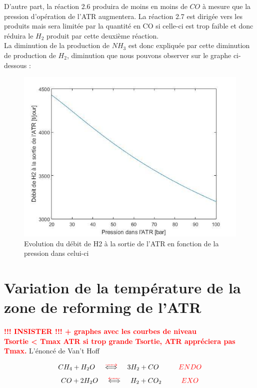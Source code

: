 \documentclass[12pt]{report}
\begin{document}
 D'autre part, la réaction 2.6 produira de moins en moins de $CO$ à mesure que la pression d'opération de l'ATR augmentera. La réaction 2.7 est dirigée vers les produits mais sera limitée par la quantité en CO si celle-ci est trop faible et donc réduira le $H_2$ produit par cette deuxième réaction.\\

La diminution de la production de $NH_3$ est donc expliquée par cette diminution de production de $H_2$, diminution que nous pouvons observer sur le graphe ci-dessous :
\begin{figure}[H]
\begin{center}
\includegraphics[scale=0.6]{debit_H2_ATR_pression_ATR}
\caption{Evolution du débit de H2 à la sortie de l'ATR en fonction de la pression dans celui-ci}
\end{center}
\end{figure}


\section{Variation de la température de la zone de reforming de l'ATR}

\textcolor{red}{\textbf{!!! INSISTER !!! + graphes avec les courbes de niveau\\
Tsortie < Tmax ATR si trop grande Tsortie, ATR appréciera pas Tmax.}}
L'énoncé de Van't Hoff 

 \begin{equation}
 CH_4 + H_2O \hspace{0.5cm}\textcolor{red}{\overrightarrow{\textcolor{black}{\Longleftrightarrow}}} \hspace{0.5cm} 3H_2 + CO \hspace{1cm}\textcolor{red}{ENDO}
 \end{equation}
 \begin{equation}
 CO + 2H_2O \hspace{0.5cm}\textcolor{red}{\overleftarrow{\textcolor{black}{\Longleftrightarrow}}} \hspace{0.5cm} H_2 + CO_2 \hspace{1cm}\textcolor{red}{EXO}
 \end{equation}
\end{document}
